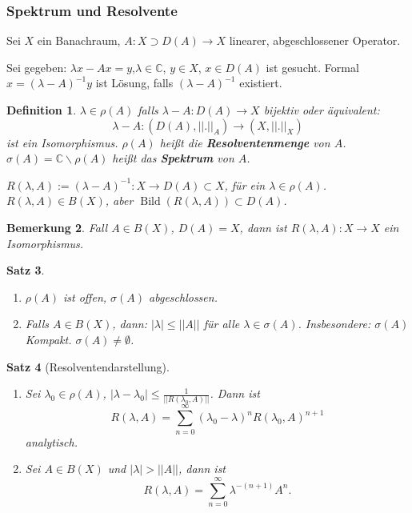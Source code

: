 \documentclass[12pt,a4paper,titlepage]{scrartcl}
\newtheorem{Satz}{Satz}[subsection]
\newtheorem{Definition}[Satz]{Definition}
\newtheorem{Bemerkung}[Satz]{Bemerkung}
\DeclareMathOperator{\Bild}{Bild}
\numberwithin{equation}{section}
\newcommand{\C}{\mathbb{C}} %
\begin{document}
	\subsubsection{Spektrum und Resolvente}
	
	Sei $X$ ein Banachraum, $A:X\supset D(A)\rightarrow X$ linearer, abgeschlossener Operator.
	
	Sei gegeben: $\lambda x-Ax=y$,$\lambda\in \C$, $y\in X$, $x\in D(A)$ ist gesucht. Formal $x=(\lambda-A)^{-1}y$ ist Lösung, falls $(\lambda-A)^{-1}$ existiert.
	
	\begin{Definition}
		$\lambda\in \rho(A)$ falls $\lambda -A: D(A)\rightarrow X$ bijektiv oder äquivalent: 
		$$\lambda-A:(D(A),||.||_A)\rightarrow (X,||.||_X)$$
		ist ein Isomorphismus. $\rho(A)$ heißt die \textbf{Resolventenmenge} von $A$. $\sigma(A)=\C\backslash\rho(A)$ heißt das \textbf{Spektrum} von $A$.
		
		$R(\lambda, A):= (\lambda-A)^{-1}: X\rightarrow D(A)\subset X$, für ein $\lambda\in \rho(A)$. $R(\lambda,A)\in B(X)$, aber $\Bild(R(\lambda,A))\subset D(A)$.
	\end{Definition}
	
	\begin{Bemerkung}
		Fall $A\in B(X)$, $D(A) = X$, dann ist $R(\lambda, A): X\rightarrow X$ ein 
		Isomorphismus.
	\end{Bemerkung}
	
	\begin{Satz}~
		\begin{enumerate}
			\item[a)] $\rho(A)$ ist offen, $\sigma(A)$ abgeschlossen.
			\item[b)] Falls $A\in B(X)$, dann: $|\lambda|\leq ||A||$ für alle $\lambda\in \sigma(A)$. Insbesondere: $\sigma(A)$ Kompakt. $\sigma(A)\neq\emptyset$.
		\end{enumerate}
	\end{Satz}
	
	\begin{Satz}[Resolventendarstellung]~
		\begin{enumerate}
			\item[a)] Sei $\lambda_0\in \rho(A)$, $|\lambda-\lambda_0|\leq\frac{1}{||R(\lambda_0,A)||}$. Dann ist
			$$R(\lambda,A) =\sum_{n = 0}^{\infty} (\lambda_0-\lambda)^n R(\lambda_0, A)^{n+1}$$
			analytisch.
			\item[b)] Sei $A\in B(X)$ und $|\lambda|>||A||$, dann ist 
			$$R(\lambda, A) = \sum_{n = 0}^{\infty}\lambda^{-(n+1)}A^n.$$ 
		\end{enumerate}
	\end{Satz}
	
\end{document}
